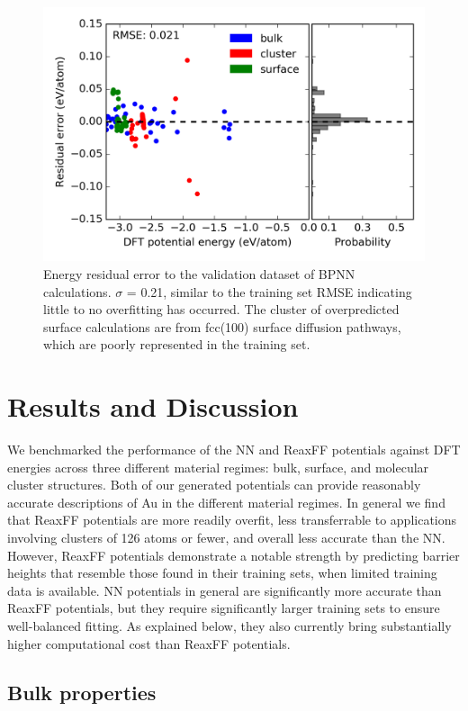 \documentclass[12pt]{cmuthesis}
\begin{document}
\begin{figure}[h]
\centering
\includegraphics[width=5in]{./images/fig-neural-valid.png}
\caption{\label{fig-neural-valid}
Energy residual error to the validation dataset of BPNN calculations. \(\sigma\) = 0.21, similar to the training set RMSE indicating little to no overfitting has occurred. The cluster of overpredicted surface calculations are from fcc(100) surface diffusion pathways, which are poorly represented in the training set.}
\end{figure}

\section{Results and Discussion}
\label{sec:orgfa99c43}
We benchmarked the performance of the NN and ReaxFF potentials against DFT energies across three different material regimes: bulk, surface, and molecular cluster structures. Both of our generated potentials can provide reasonably accurate descriptions of Au in the different material regimes. In general we find that ReaxFF potentials are more readily overfit, less transferrable to applications involving clusters of 126 atoms or fewer, and overall less accurate than the NN. However, ReaxFF potentials demonstrate a notable strength by predicting barrier heights that resemble those found in their training sets, when limited training data is available. NN potentials in general are significantly more accurate than ReaxFF potentials, but they require significantly larger training sets to ensure well-balanced fitting. As explained below, they also currently bring substantially higher computational cost than ReaxFF potentials.

\subsection{Bulk properties}
\label{sec:org9872d10}
\end{document}
